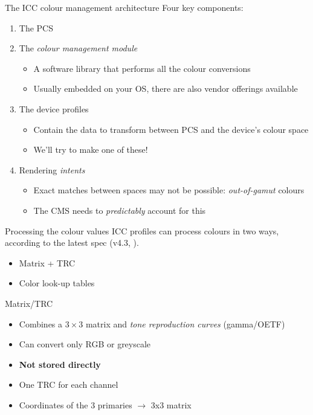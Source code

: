 \documentclass[final, aspectratio=169]{divoc}
\begin{document}
\begin{frame}{The ICC colour management architecture}
  Four key components:
  \begin{enumerate}[<+(1)->]
    \item The PCS
    \item The \emph{colour management module}
          \begin{itemize}
            \item A software library that performs all the colour conversions
            \item Usually embedded on your OS, there are also vendor offerings available
          \end{itemize}
    \item The device profiles
          \begin{itemize}
            \item Contain the data to transform between PCS and the device's colour space
            \item {} We'll try to make one of these!
          \end{itemize}
    \item Rendering \emph{intents}
          \begin{itemize}
            \item Exact matches between spaces may not be possible: \emph{out-of-gamut} colours
            \item The CMS needs to \emph{predictably} account for this
          \end{itemize}
  \end{enumerate}
\end{frame}
\begin{frame}{Processing the colour values}
  ICC profiles can process colours in two ways, according to the latest spec (v4.3, \cite*{icc}).
  \begin{itemize}[<+(1)->]
    \item Matrix + TRC
    \item Color look-up tables
  \end{itemize}
\end{frame}
\begin{frame}{Matrix/TRC}
  \begin{itemize}
    \item Combines a $3\times3$ matrix and \emph{tone reproduction curves}
          (gamma/OETF)
    \item Can convert only RGB or greyscale
    \item \textbf{Not stored directly}
    \item One TRC for each channel
    \item Coordinates of the 3 primaries $\rightarrow$ 3x3 matrix
  \end{itemize}
\end{frame}
\end{document}
